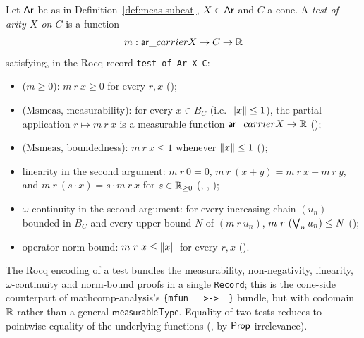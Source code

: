 \begin{definition}%
  \label{def:test-of}
  \rocqok
  Let $\mathsf{Ar}$ be as in Definition~\ref{def:meas-subcat}, $X \in \mathsf{Ar}$ and
  $C$ a cone. A \emph{test of arity $X$ on $C$} is a function
  \[
    m : \mathsf{ar}\_carrier X \to C \to \mathbb{R}
  \]
  satisfying, in the Rocq record \texttt{test\_of\ Ar\ X\ C}:
  \begin{itemize}
    \item ($m \ge 0$): $m\ r\ x \ge 0$ for every $r, x$
      ();
    \item ($\mathrm{Msmeas}$, measurability): for every $x \in B_C$
      (i.e.\ $\lVert x \rVert \le 1$), the partial application
      $r \mapsto m\ r\ x$ is a measurable function
      $\mathsf{ar}\_carrier X \to \mathbb{R}$
      ();
    \item ($\mathrm{Msmeas}$, boundedness): $m\ r\ x \le 1$ whenever
      $\lVert x \rVert \le 1$ ();
    \item linearity in the second argument: $m\ r\ 0 = 0$,
      $m\ r\ (x + y) = m\ r\ x + m\ r\ y$, and
      $m\ r\ (s \cdot x) = s \cdot m\ r\ x$ for $s \in \mathbb{R}_{\geq 0}$
      (,
      ,
      );
    \item $\omega$-continuity in the second argument: for every
      increasing chain $(u_n)$ bounded in $B_C$ and every upper bound
      $N$ of $(m\ r\ u_n)$, $m\ r\ (\bigvee_n u_n) \le N$
      ();
    \item operator-norm bound: $m\ r\ x \le \lVert x \rVert$ for every
      $r, x$ ().
  \end{itemize}
\end{definition}

\begin{remark}
  The Rocq encoding of a test bundles the measurability,
  non-negativity, linearity, $\omega$-continuity and norm-bound
  proofs in a single \texttt{Record}; this is the cone-side
  counterpart of mathcomp-analysis's \texttt{\{mfun \_ >-> \_\}}
  bundle, but with codomain $\mathbb{R}$ rather than a general
  $\mathsf{measurableType}$. Equality of two tests reduces to
  pointwise equality of the underlying functions
  (, by $\mathsf{Prop}$-irrelevance).
\end{remark}

